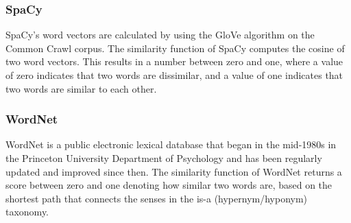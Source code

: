 \documentclass{article}
\begin{document}
\subsubsection{SpaCy}
SpaCy's word vectors are calculated by using the GloVe algorithm on the Common Crawl corpus. The similarity function of SpaCy computes the cosine of two word vectors. This results in a number between zero and one, where a value of zero indicates that two words are dissimilar, and a value of one indicates that two words are similar to each other. %

\subsubsection{WordNet}
WordNet is a public electronic lexical database that began in the mid-1980s in the Princeton University Department of Psychology and has been regularly updated and improved since then. The similarity function of WordNet returns a score between zero and one denoting how similar two words are, based on the shortest path that connects the senses in the is-a (hypernym/hyponym) taxonomy. %
\end{document}
